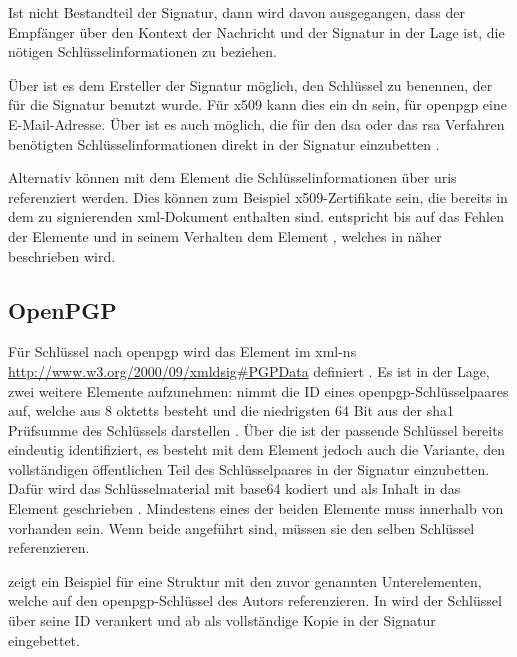 Ist  nicht Bestandteil der Signatur, dann wird davon ausgegangen, dass der Empfänger über den Kontext der Nachricht und der Signatur in der
Lage ist, die nötigen Schlüsselinformationen zu beziehen.

Über  ist es dem Ersteller der Signatur möglich, den Schlüssel zu benennen, der für die Signatur benutzt wurde. Für \gls{x509} kann dies ein
\gls{dn} sein, für \gls{openpgp} eine E-Mail-Adresse. Über  ist es auch möglich, die für den \gls{dsa} oder das \gls{rsa} Verfahren
benötigten Schlüsselinformationen direkt in der Signatur einzubetten \cite{xml-dsig:w3c}.  

Alternativ können mit dem Element  die Schlüsselinformationen über \glspl{uri} referenziert werden. Dies können zum Beispiel
\gls{x509}-Zertifikate sein, die bereits in dem zu signierenden \gls{xml}-Dokument enthalten sind.  entspricht bis auf
das Fehlen der Elemente  und  in seinem Verhalten dem Element , welches in 
 näher beschrieben wird.

\subsection{OpenPGP}
Für Schlüssel nach \gls{openpgp} wird das Element  im \gls{xml-ns} \url{http://www.w3.org/2000/09/xmldsig#PGPData}
definiert \cite{xml-sec-uri:ietf}. Es ist in der Lage, zwei weitere Elemente aufzunehmen:  nimmt die ID eines \gls{openpgp}-Schlüsselpaares
auf, welche aus 8 \glspl{oktett} besteht und die niedrigsten 64 Bit aus der \gls{sha1} Prüfsumme des Schlüssels darstellen \cite{openpgp:ietf}. Über die
 ist der passende Schlüssel bereits eindeutig identifiziert, es besteht mit dem Element  jedoch auch die Variante, den
vollständigen öffentlichen Teil des Schlüsselpaares in der Signatur einzubetten. Dafür wird das Schlüsselmaterial mit \gls{base64} kodiert und als Inhalt in das
Element geschrieben \cite{xml-dsig:w3c}. Mindestens eines der beiden Elemente muss innerhalb von  vorhanden sein. Wenn beide angeführt sind,
müssen sie den selben Schlüssel referenzieren.

 zeigt ein Beispiel für eine Struktur mit den zuvor genannten Unterelementen, welche auf den \gls{openpgp}-Schlüssel des Autors
referenzieren. In  wird der Schlüssel über seine ID verankert und ab  als
vollständige Kopie in der Signatur eingebettet.

